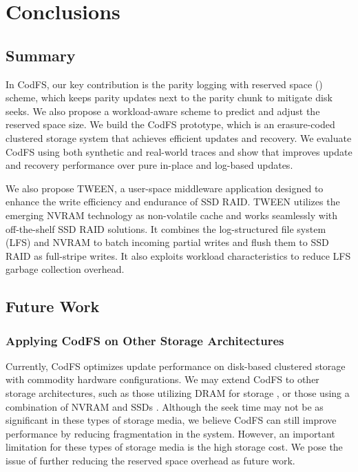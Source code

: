 \chapter{Conclusions}
\label{chap:conclusions}

\section{Summary}

In CodFS, our key contribution is the parity logging with reserved space (\PLR) scheme,
which keeps parity updates next to the parity chunk to mitigate disk seeks. We
also propose a workload-aware scheme to predict and adjust the reserved space
size.  We build the CodFS prototype, which is an erasure-coded clustered storage system
that achieves efficient updates and recovery.  We evaluate CodFS 
using both synthetic and real-world traces and show that \PLR improves update
and recovery performance over pure in-place and log-based updates.  

We also propose TWEEN, a user-space middleware application designed to enhance
the write efficiency and endurance of SSD RAID. TWEEN utilizes the emerging
NVRAM technology as non-volatile cache and works seamlessly with off-the-shelf
SSD RAID solutions. It combines the log-structured file system (LFS) and NVRAM
to batch incoming partial writes and flush them to SSD RAID as full-stripe
writes. It also exploits workload characteristics to reduce LFS garbage
collection overhead. 

\section{Future Work}

\subsection{Applying CodFS on Other Storage Architectures}

Currently, CodFS optimizes update performance on disk-based clustered storage
with commodity hardware configurations. We may extend CodFS to other storage
architectures, such as those utilizing DRAM for storage \cite{ongaro11}, or those using
a combination of NVRAM and SSDs \cite{qiu13}. Although the seek time may not be
as significant in these types of storage media, we believe CodFS can still
improve performance by reducing fragmentation in the system. However, an
important limitation for these types of storage media is the high storage cost.
We pose the issue of further reducing the reserved space overhead as future
work.

